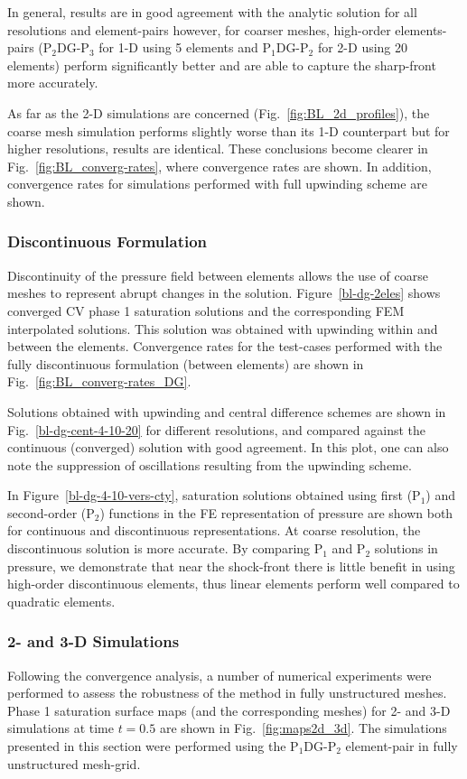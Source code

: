 \documentclass[preprint,authoryear,12pt]{elsarticle}
\newcommand{\PN}[2][error]{P$_{#1}$DG-P$_{#2}$}
\begin{document}
In general, results are in good agreement with the analytic solution for all resolutions and element-pairs however, for coarser meshes, high-order elements-pairs (\PN[2]{3} for 1-D using 5 elements and \PN[1]{2} for 2-D using 20 elements) perform significantly better and are able to capture the sharp-front more accurately. 

As far as the 2-D simulations are concerned (Fig.~\ref{fig:BL_2d_profiles}), the coarse mesh simulation performs slightly worse than its 1-D counterpart but for higher resolutions, results are identical. These conclusions become clearer in Fig.~\ref{fig:BL_converg-rates}, where convergence rates are shown. In addition, convergence rates for simulations performed with full upwinding scheme are shown.


\subsubsection{Discontinuous Formulation}
Discontinuity of the pressure field between elements allows the use of coarse meshes to represent abrupt changes in the solution. Figure~\ref{bl-dg-2eles} shows converged CV phase 1 saturation solutions and the corresponding FEM interpolated solutions. This solution was obtained with upwinding within and between the elements.  Convergence rates for the test-cases performed with the fully discontinuous formulation (between elements) are shown in Fig.~\ref{fig:BL_converg-rates_DG}.

Solutions obtained with upwinding and central difference schemes are shown in Fig.~\ref{bl-dg-cent-4-10-20} for different resolutions, and compared against the continuous (converged) solution with good agreement. In this plot, one can also note the suppression of oscillations resulting from the upwinding scheme.

In Figure~\ref{bl-dg-4-10-vers-cty}, saturation solutions obtained using first (P$_{1}$) and second-order (P$_{2}$) functions in the FE representation of pressure are shown both for continuous and discontinuous representations. At coarse resolution, the discontinuous solution is more accurate. By comparing P$_{1}$ and P$_{2}$ solutions in pressure, we demonstrate that near the shock-front there is little benefit in using high-order discontinuous elements, thus linear elements perform well compared to quadratic elements.

\subsubsection{2- and 3-D Simulations}
Following the convergence analysis, a number of numerical experiments were performed to assess the robustness of the method in fully unstructured meshes. Phase 1 saturation surface maps (and the corresponding meshes) for 2- and 3-D simulations at time $t=0.5$ are shown in Fig.~\ref{fig:maps2d_3d}. The simulations presented in this section were performed using the \PN[1]{2} element-pair in fully unstructured mesh-grid.
\end{document}
